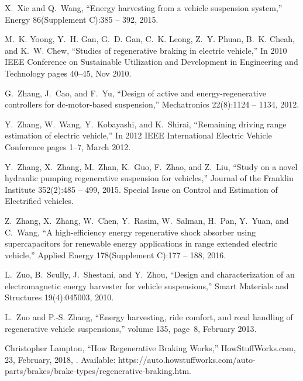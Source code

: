 X.~Xie and Q.~Wang,
\newblock ``Energy harvesting from a vehicle suspension system,''
\newblock Energy 86(Supplement C):385 -- 392, 2015.

M.~K. Yoong, Y.~H. Gan, G.~D. Gan, C.~K. Leong, Z.~Y. Phuan, B.~K. Cheah, and
  K.~W. Chew,
\newblock ``Studies of regenerative braking in electric vehicle,''
\newblock In 2010 IEEE Conference on Sustainable Utilization and
  Development in Engineering and Technology pages 40--45, Nov 2010.

G.~Zhang, J.~Cao, and F.~Yu,
\newblock ``Design of active and energy-regenerative controllers for
  dc-motor-based suspension,''
\newblock Mechatronics 22(8):1124 -- 1134, 2012.

Y.~Zhang, W.~Wang, Y.~Kobayashi, and K.~Shirai,
\newblock ``Remaining driving range estimation of electric vehicle,''
\newblock In 2012 IEEE International Electric Vehicle Conference pages
  1--7, March 2012.

Y.~Zhang, X.~Zhang, M.~Zhan, K.~Guo, F.~Zhao, and Z.~Liu,
\newblock ``Study on a novel hydraulic pumping regenerative suspension for
  vehicles,''
\newblock Journal of the Franklin Institute 352(2):485 -- 499, 2015.
\newblock Special Issue on Control and Estimation of Electrified vehicles.

Z.~Zhang, X.~Zhang, W.~Chen, Y.~Rasim, W.~Salman, H.~Pan, Y.~Yuan, and C.~Wang,
\newblock ``A high-efficiency energy regenerative shock absorber using
  supercapacitors for renewable energy applications in range extended electric vehicle,''
\newblock Applied Energy 178(Supplement C):177 -- 188, 2016.

L.~Zuo, B.~Scully, J.~Shestani, and Y.~Zhou,
\newblock ``Design and characterization of an electromagnetic energy harvester for vehicle suspensions,''
\newblock Smart Materials and Structures 19(4):045003, 2010.

L.~Zuo and P.-S. Zhang,
\newblock ``Energy harvesting, ride comfort, and road handling of regenerative vehicle suspensions,''
\newblock volume 135, page~8, February 2013.

Christopher Lampton,
\newblock ``How Regenerative Braking Works,''
\newblock HowStuffWorks.com, 23, February, 2018, 
\newblock [Online]. Available: https://auto.howstuffworks.com/auto-parts/brakes/brake-types/regenerative-braking.htm.


